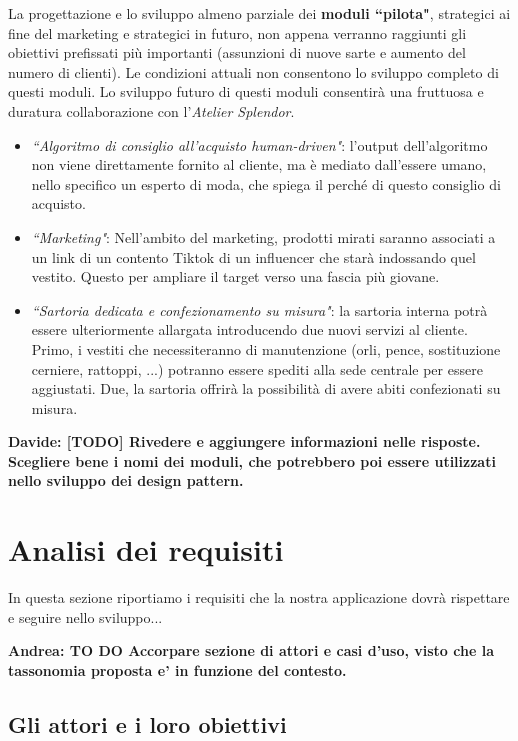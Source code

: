 \documentclass[12pt]{article}
\newcommand{\andrea}[1]{{\bf \color{mauve} Andrea: #1 }}
\newcommand{\davide}[1]{{\bf \color{chromeyellow} Davide: #1 }}
\begin{document}
La progettazione e lo sviluppo almeno parziale dei \textbf{moduli ``pilota"}, strategici ai fine del marketing e strategici in futuro, non appena verranno raggiunti gli obiettivi prefissati più importanti (assunzioni di nuove sarte e aumento del numero di clienti). Le condizioni attuali non consentono lo sviluppo completo di questi moduli. Lo sviluppo futuro di questi moduli consentirà una fruttuosa e duratura collaborazione con l'{\em Atelier Splendor}.
\begin{itemize}
    \item {\em ``Algoritmo di consiglio all'acquisto human-driven"}: l'output dell'algoritmo non viene direttamente fornito al cliente, ma è mediato dall'essere umano, nello specifico un esperto di moda, che spiega il perché di questo consiglio di acquisto.
    \item {\em ``Marketing"}: Nell'ambito del marketing, prodotti mirati saranno associati a un link di un contento Tiktok di un influencer che starà indossando quel vestito. Questo per ampliare il target verso una fascia più giovane.
    \item {\em ``Sartoria dedicata e confezionamento su misura"}: la sartoria interna potrà essere ulteriormente allargata introducendo due nuovi servizi al cliente. Primo, i vestiti che necessiteranno di manutenzione (orli, pence, sostituzione cerniere, rattoppi, ...) potranno essere spediti alla sede centrale per essere aggiustati. Due, la sartoria offrirà la possibilità di avere abiti confezionati su misura.
\end{itemize}

\davide{\textbf{[TODO]} Rivedere e aggiungere informazioni nelle risposte. Scegliere bene i nomi dei moduli, che potrebbero poi essere utilizzati nello sviluppo dei design pattern.}

\section{Analisi dei requisiti}

In questa sezione riportiamo i requisiti che la nostra applicazione dovrà rispettare e seguire nello sviluppo...

\andrea{\textbf{TO DO} Accorpare sezione di attori e casi d'uso, visto che la tassonomia proposta e' in funzione del contesto.}

\subsection{Gli attori e i loro obiettivi}
\end{document}
